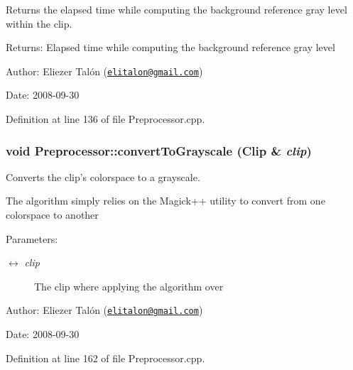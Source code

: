 Returns the elapsed time while computing the background reference gray level within the clip. 

\begin{Desc}
\item[Returns:]Elapsed time while computing the background reference gray level\end{Desc}
\begin{Desc}
\item[Author:]Eliezer Talón (\href{mailto:elitalon@gmail.com}{\tt elitalon@gmail.com}) \end{Desc}
\begin{Desc}
\item[Date:]2008-09-30 \end{Desc}


Definition at line 136 of file Preprocessor.cpp.\hypertarget{class_preprocessor_c9a0935f5eac55d15aa632fcce9b478e}{
\subsubsection[convertToGrayscale]{\setlength{\rightskip}{0pt plus 5cm}void Preprocessor::convertToGrayscale ({\bf Clip} \& {\em clip})}}
\label{class_preprocessor_c9a0935f5eac55d15aa632fcce9b478e}


Converts the clip's colorspace to a grayscale. 

The algorithm simply relies on the Magick++ utility to convert from one colorspace to another

\begin{Desc}
\item[Parameters:]
\begin{description}
\item[\mbox{$\leftrightarrow$} {\em clip}]The clip where applying the algorithm over\end{description}
\end{Desc}
\begin{Desc}
\item[Author:]Eliezer Talón (\href{mailto:elitalon@gmail.com}{\tt elitalon@gmail.com}) \end{Desc}
\begin{Desc}
\item[Date:]2008-09-30 \end{Desc}


Definition at line 162 of file Preprocessor.cpp.

